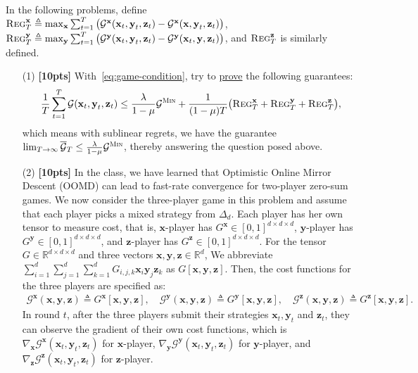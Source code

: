 \documentclass[a4paper]{article}
\numberwithin{equation}{section}
\theoremstyle{definition}
\theoremstyle{definition}
\def \G {\mathcal{G}}
\def \R {\mathbb{R}}
\def \x {\textbf{x}}
\def \y {\textbf{y}}
\def \z {\textbf{z}}
\def \Gx {\mathcal{G}^\x}
\def \Gy {\mathcal{G}^\y}
\def \Gz {\mathcal{G}^\z}
\def \reg {\textsc{Reg}}
\begin{document}
In the following problems, define $\reg_T^\x\triangleq \max_\x \sum_{t=1}^{T}\big(\Gx(\x_t,\y_t,\z_t) - \Gx(\x,\y_t,\z_t)\big)$, $\reg_T^\y\triangleq \max_\y \sum_{t=1}^{T}\big(\Gy(\x_t,\y_t,\z_t) - \Gy(\x_t,\y,\z_t)\big)$, and $\reg_T^\z$ is similarly defined.
\begin{enumerate}
  \item[(1)] \textbf{[10pts]} With~\eqref{eq:game-condition}, try to \underline{prove} the following guarantees:
  \begin{align*}
    \frac{1}{T}\sum_{t=1}^{T}\G(\x_t, \y_t, \z_t) \le\frac{\lambda}{1-\mu}\G^\textsc{Min} + \frac{1}{(1-\mu)T}\big( \reg_T^\x + \reg_T^\y + \reg_T^\z \big),
  \end{align*}
  which means with sublinear regrets, we have the guarantee $\lim_{T\to\infty}\overline{\G}_T\le\frac{\lambda}{1-\mu}\G^\textsc{Min}$, thereby answering the question posed above.
  \item[(2)] \textbf{[10pts]} In the class, we have learned that Optimistic Online Mirror Descent (OOMD) can lead to fast-rate convergence for two-player zero-sum games. We now consider the three-player game in this problem and assume that each player picks a mixed strategy from $\Delta_d$. Each player has her own tensor to measure cost, that is, $\x$-player has $G^\x\in[0,1]^{d\times d\times d}$, $\y$-player has $G^\y\in[0,1]^{d\times d\times d}$, and $\z$-player has $G^\z\in[0,1]^{d\times d\times d}$. For the tensor $G\in\R^{d\times d\times d}$ and three vectors $\x,\y,\z\in\R^d$, We abbreviate $\sum_{i=1}^d\sum_{j=1}^d\sum_{k=1}^d G_{i,j,k}\x_i \y_j\z_k$ as $G[\x,\y,\z]$. Then, the cost functions for the three players are specified as:
  \begin{align*}
    \Gx(\x, \y, \z) \triangleq G^\x[\x,\y,\z],\quad \Gy(\x, \y, \z) \triangleq G^\y[\x,\y,\z],\quad\Gz(\x, \y, \z) \triangleq G^\z[\x,\y,\z].
  \end{align*}
  In round $t$, after the three players submit their strategies $\x_t,\y_t$ and $\z_t$, they can observe the gradient of their own cost functions, which is $\nabla_\x \Gx(\x_t,\y_t,\z_t)$ for $\x$-player, $\nabla_\y \Gy(\x_t,\y_t,\z_t)$ for $\y$-player, and $\nabla_\z \Gz(\x_t,\y_t,\z_t)$ for $\z$-player.
  

\end{enumerate}
\end{document}
